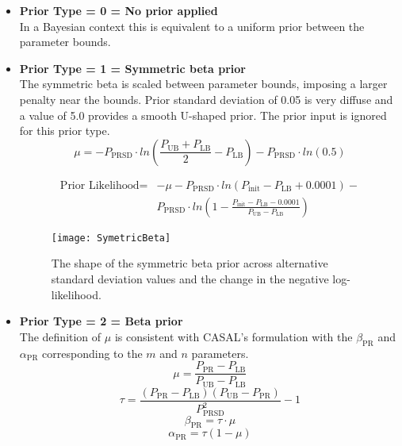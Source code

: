 \begin{itemize}
	\item  \textbf{Prior Type = 0 = No prior applied} \\ 
	In a Bayesian context this is equivalent to a uniform prior between the parameter bounds.
	
	\item  \textbf{Prior Type = 1 = Symmetric beta prior} \\ 
	The symmetric beta is scaled between parameter bounds, imposing a larger penalty near the bounds.  Prior standard deviation of 0.05 is very diffuse and a value of 5.0 provides a smooth U-shaped prior. The prior input is ignored for this prior type.
	\begin{equation} 
		\mu = -P_\text{PRSD} \cdot ln\left(\frac{P_\text{UB}+P_\text{LB}}{2} - P_\text{LB} \right) - P_\text{PRSD} \cdot ln(0.5)
	\end{equation}
	
	\begin{equation}
		\begin{split}
\text{Prior Likelihood} = &-\mu -P_\text{PRSD} \cdot ln\left(P_\text{init}-P_\text{LB}+0.0001\right) - \\
& P_\text{PRSD} \cdot ln\left(1-\frac{P_\text{init}-P_\text{LB}-0.0001}{P_\text{UB}-P_\text{LB}}\right)
		\end{split}
	\end{equation}

	\begin{figure}[h]
	\begin{center}
		\texttt{[image: SymetricBeta]}\\
	\end{center}
	\caption{The shape of the symmetric beta prior across alternative standard deviation values and the change in the negative log-likelihood.}
	\end{figure}	

	
	\item \textbf{Prior Type = 2 = Beta prior}  \\ 
	The definition of $\mu$ is consistent with CASAL's formulation with the $\beta_\text{PR}$ and $\alpha_\text{PR}$ corresponding to the $m$ and $n$ parameters.
	\begin{equation}
		\mu = \frac{P_\text{PR}-P_\text{LB}}{P_\text{UB}-P_\text{LB}} 
	\end{equation}
	\begin{equation}
		\tau  = \frac{(P_\text{PR}-P_\text{LB})(P_\text{UB}-P_\text{PR})}{P_\text{PRSD}^2}-1
	\end{equation}
	\begin{equation}
		\beta_\text{PR}  = \tau \cdot \mu
	\end{equation}
	\begin{equation}
		\alpha_\text{PR} = \tau (1-\mu)
	\end{equation}
	

\end{itemize}
